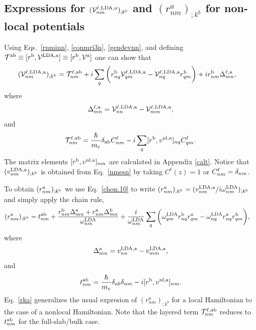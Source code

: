 \documentclass[floatfix,prb,aps,superscriptaddress,11pt,preprint,letterpaper]{revtex4}
\def\chon{red}
\begin{document}
\subsection{Expressions for 
\texorpdfstring{$({\mathbf{\cal V}}^{\ell,\mathrm{LDA},a}_{nm})_{;k^b}$}{Vnonlocal}
and \texorpdfstring{$(r^a_{nm})_{;k^b}$}{Vnonlocal}
for non-local potentials}\label{appvnl}

Using Eqs.~\eqref{rnminn}, \eqref{conmri3n}, \eqref{gendevnn}, and
defining 
$
{\cal T}^{\mathrm{a}\mathrm{b}}\equiv[r^{\mathrm{b}},{\mathbf{\cal V}}^{\mathrm{LDA},\mathrm{a}}]
\equiv
[r^{\mathrm{b}},{\mathbf{\cal V}}^{\mathrm{a}}]
$
one can show that{\color{\chon} 
\begin{align}\label{nmesn}
({\mathbf{\cal V}}^{\ell,\mathrm{LDA},\mathrm{a}}_{nm})_{;k^{\mathrm{b}}}&=
{\cal T}_{nm}^{\ell,\mathrm{a}\mathrm{b}}
+i
\sum_{q}
\bigg(
r^{\mathrm{b}}_{nq}  
{\mathbf{\cal V}}^{\ell,\mathrm{LDA},\mathrm{a}}_{q m}
-
{\mathbf{\cal V}}^{\ell,\mathrm{LDA},\mathrm{a}}_{nq}   
r^{\mathrm{b}}_{q m}
\bigg)  
+i  
r^{\mathrm{b}}_{nm}
\Delta^{\ell,\mathrm{a}}_{mn}
,
\end{align}}
where
\begin{eqnarray}\label{tdel}
\Delta^{\ell,\mathrm{a}}_{mn}
=
{\mathbf{\cal V}}^{\ell,\mathrm{LDA},\mathrm{a}}_{nn}  
-
{\mathbf{\cal V}}^{\ell,\mathrm{LDA},\mathrm{a}}_{mm}  
,
\end{eqnarray} 
and
\begin{align}\label{tau.1}
{\cal T}_{nm}^{\ell,\mathrm{a}\mathrm{b}}
=
\frac{\hbar}{m_e}\delta_{\mathrm{a}\mathrm{b}}
C^\ell_{nm} 
-i 
\sum_q 
[r^{\mathrm{b}},v^{\mathrm{nl},\mathrm{a}}]_{nq}C^\ell_{qm} 
.
\end{align}  
The matrix elements $[r^{\mathrm{b}},v^{\mathrm{nl},\mathrm{a}}]_{nm}$
are calculated in Appendix \ref{calt}.
Notice that
{\color{\chon} 
$(v^{\mathrm{LDA},\mathrm{a}}_{nm})_{;k^{\mathrm{b}}}$} is obtained 
from Eq.~\eqref{nmesn} by 
taking 
{\color{\chon} $C^\ell(z)=1$ or $C^\ell_{nm}=\delta_{nm}$.}

To obtain $(r^{\mathrm{a}}_{nm})_{;k^{\mathrm{b}}}$ we use Eq.~\eqref{chon.10} to
write
$(r^{\mathrm{a}}_{nm})_{;k^{\mathrm{b}}}
=(v^{\mathrm{LDA},\mathrm{a}}_{nm}/i\omega^{\mathrm{LDA}}_{nm})_{;k^{\mathrm{b}}}
$ {\color{\chon} and} simply apply the chain rule,
\begin{align}\label{rka}
(r^{\mathrm{a}}_{nm})_{;k^{\mathrm{b}}}
&=
t^{\mathrm{a}\mathrm{b}}_{nm}
+
\frac{ 
r^{\mathrm{b}}_{nm}
\Delta^{\mathrm{a}}_{mn}
+r^{\mathrm{a}}_{nm}
\Delta^{\mathrm{b}}_{mn}
}
{\omega^{\mathrm{LDA}}_{nm}}
+
\frac{i}{\omega^{\mathrm{LDA}}_{nm}}
\sum_{q}
\bigg(
\omega^{\mathrm{LDA}}_{q m} 
r^{\mathrm{b}}_{nq} 
r^{\mathrm{a}}_{q m}
-
\omega^{\mathrm{LDA}}_{nq} 
r^{\mathrm{a}}_{nq} 
r^{\mathrm{b}}_{q m}
\bigg)
,
\end{align} 
where 
\begin{eqnarray}\label{del}
\Delta^{\mathrm{a}}_{mn}
=
v^{\mathrm{LDA},\mathrm{a}}_{nn}  
-
v^{\mathrm{LDA},\mathrm{a}}_{mm}  
,
\end{eqnarray}
and{\color{\chon} 
\begin{align}\label{tau.1n} 
t_{nm}^{\mathrm{a}\mathrm{b}}
=\frac{\hbar}{m_e}\delta_{ab}\delta_{nm} 
-i [r^{\mathrm{b}},v^{\mathrm{nl},\mathrm{a}}]_{nm} 
.
\end{align}}
Eq.~\eqref{rka} generalizes the usual expresion of
$(r^a_{nm})_{;k^b}$ for {\color{\chon} a} local 
{\color{\chon} Hamiltonian}
\cite{aversaPRB95,nastosPRB05,cabellosPRB09,rashkeevPRB98}
to
the case of a
nonlocal Hamiltonian.
Note that the layered term
${\cal T}^{\ell,\mathrm{a}\mathrm{b}}_{nm}$ reduces to $t^{\mathrm{a}\mathrm{b}}_{nm}$
{\color{\chon} for the full-slab/bulk case.}
\end{document}
